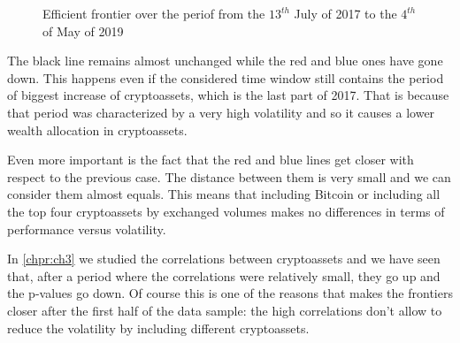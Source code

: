 \begin{figure}[H]
    \centering
    \caption{Efficient frontier over the periof from the $13^{th}$ July of 2017 to the $4^{th}$ of May of 2019}
\end{figure}
\bigskip


The black line remains almost unchanged while the red and blue ones have gone down. This happens even if the considered time window still contains the period of biggest increase of cryptoassets, which is the last part of 2017. That is because that period was characterized by a very high volatility and so it causes a lower wealth allocation in cryptoassets.

Even more important is the fact that the red and blue lines get closer with respect to the previous case. 
The distance between them is very small and we can consider them almost equals. This means that including Bitcoin or including all the top four cryptoassets by exchanged volumes makes no differences in terms of performance versus volatility.

In \autoref{chpr:ch3} we studied the correlations between cryptoassets and we have seen that, after a period where the correlations were relatively small, they go up and the p-values go down. Of course this is one of the reasons that makes the frontiers closer after the first half of the data sample: the high correlations don't allow to reduce the volatility by including different cryptoassets.
\bigskip

